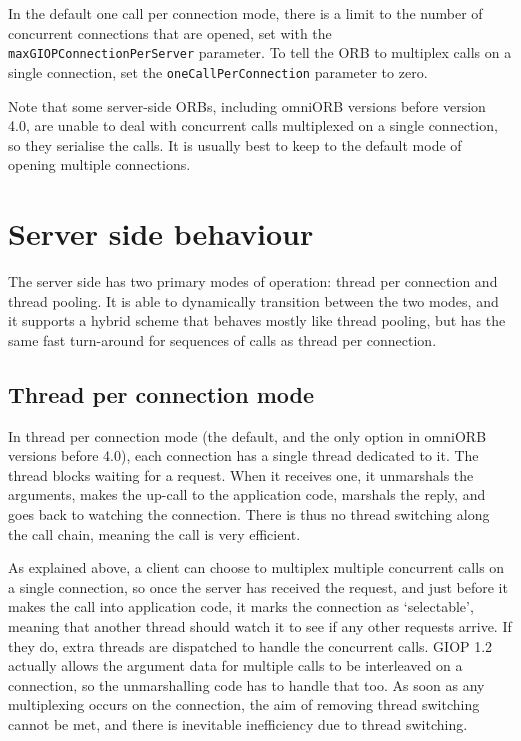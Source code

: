 \documentclass[11pt,twoside,a4paper]{book}
\newcommand{\code}[1]{\texttt{#1}}
\newcommand{\dsc}{\discretionary{}{}{}}
\begin{document}
In the default one call per connection mode, there is a limit to the
number of concurrent connections that are opened, set with the
\code{maxGIOPConnection\dsc{}PerServer} parameter. To tell the ORB to
multiplex calls on a single connection, set the
\code{oneCallPerConnection} parameter to zero.

Note that some server-side ORBs, including omniORB versions before
version 4.0, are unable to deal with concurrent calls multiplexed on a
single connection, so they serialise the calls. It is usually best to
keep to the default mode of opening multiple connections.



\section{Server side behaviour}

The server side has two primary modes of operation: thread per
connection and thread pooling. It is able to dynamically transition
between the two modes, and it supports a hybrid scheme that behaves
mostly like thread pooling, but has the same fast turn-around for
sequences of calls as thread per connection.

\subsection{Thread per connection mode}

In thread per connection mode (the default, and the only option in
omniORB versions before 4.0), each connection has a single thread
dedicated to it. The thread blocks waiting for a request. When it
receives one, it unmarshals the arguments, makes the up-call to the
application code, marshals the reply, and goes back to watching the
connection. There is thus no thread switching along the call chain,
meaning the call is very efficient.

As explained above, a client can choose to multiplex multiple
concurrent calls on a single connection, so once the server has
received the request, and just before it makes the call into
application code, it marks the connection as `selectable', meaning
that another thread should watch it to see if any other requests
arrive. If they do, extra threads are dispatched to handle the
concurrent calls. GIOP 1.2 actually allows the argument data for
multiple calls to be interleaved on a connection, so the unmarshalling
code has to handle that too. As soon as any multiplexing occurs on the
connection, the aim of removing thread switching cannot be met, and
there is inevitable inefficiency due to thread switching.
\end{document}
